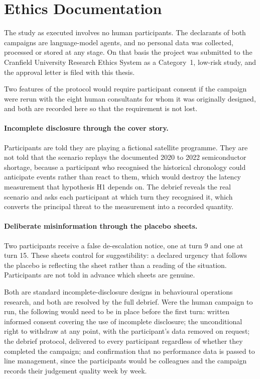 \section{Ethics Documentation}
\label{app:ethics}

The study as executed involves no human participants. The declarants of both campaigns are
language-model agents, and no personal data was collected, processed or stored at any stage. On
that basis the project was submitted to the Cranfield University Research Ethics System as a
Category~1, low-risk study, and the approval letter is filed with this thesis.

Two features of the protocol would require participant consent if the campaign were rerun
with the eight human consultants for whom it was originally designed, and both are recorded
here so that the requirement is not lost.

\paragraph{Incomplete disclosure through the cover story.} Participants are told they are
playing a fictional satellite programme. They are not told that the scenario replays the
documented 2020 to 2022 semiconductor shortage, because a participant who recognised the
historical chronology could anticipate events rather than react to them, which would destroy
the latency measurement that hypothesis H1 depends on. The debrief reveals the real scenario
and asks each participant at which turn they recognised it, which converts the principal
threat to the measurement into a recorded quantity.

\paragraph{Deliberate misinformation through the placebo sheets.} Two participants receive a
false de-escalation notice, one at turn 9 and one at turn 15. These sheets control for
suggestibility: a declared urgency that follows the placebo is reflecting the sheet rather
than a reading of the situation. Participants are not told in advance which sheets are
genuine.

Both are standard incomplete-disclosure designs in behavioural operations research, and both
are resolved by the full debrief. Were the human campaign to run, the following would need to
be in place before the first turn: written informed consent covering the use of incomplete
disclosure; the unconditional right to withdraw at any point, with the participant's data
removed on request; the debrief protocol, delivered to every participant regardless of
whether they completed the campaign; and confirmation that no performance data is passed to
line management, since the participants would be colleagues and the campaign records their
judgement quality week by week.

